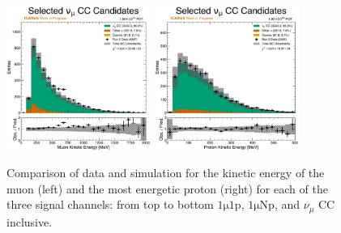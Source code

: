 \begin{figure}
    \\
    \includegraphics[width=0.42\textwidth]{figures/data_mc_comparisons/datamc_hist1d_1muX_muon_ke.pdf}
    \includegraphics[width=0.42\textwidth]{figures/data_mc_comparisons/datamc_hist1d_1muX_proton_ke.pdf}
    \caption{Comparison of data and simulation for the kinetic energy of the muon (left) and the most energetic proton (right) for each of the three signal channels: from top to bottom $\mathrm{1\mu 1p}$, $\mathrm{1\mu Np}$, and $\nu_\mu$ CC inclusive.}
    \label{fig:datamc_muon_proton_ke}
\end{figure}

